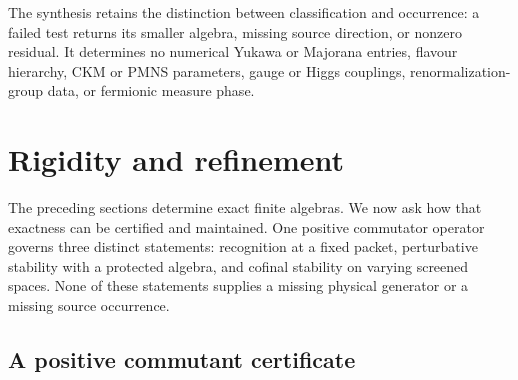 \documentclass[11pt]{article}
\numberwithin{equation}{section}
\theoremstyle{definition}
\theoremstyle{remark}
\begin{document}
The synthesis retains the distinction between classification and occurrence:
a failed test returns its smaller algebra, missing source direction, or
nonzero residual.  It determines no numerical Yukawa or Majorana entries,
flavour hierarchy, CKM or PMNS parameters, gauge or Higgs couplings,
renormalization-group data, or fermionic measure phase.


\section{Rigidity and refinement}
\label{sec:certificate}

The preceding sections determine exact finite algebras.  We now ask how
that exactness can be certified and maintained.  One positive commutator
operator governs three distinct statements: recognition at a fixed packet,
perturbative stability with a protected algebra, and cofinal stability on
varying screened spaces.  None of these statements supplies a missing
physical generator or a missing source occurrence.


\subsection{A positive commutant certificate}
\end{document}
